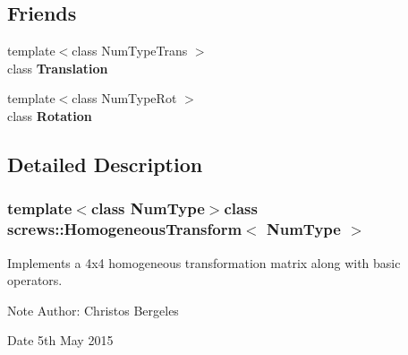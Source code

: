 \subsection*{Friends}
\begin{DoxyCompactItemize}
\item 
\hypertarget{classscrews_1_1_homogeneous_transform_a01e1886aafbf1483da899aba3b6c58da}{{\footnotesize template$<$class Num\+Type\+Trans $>$ }\\class {\bfseries Translation}}\label{classscrews_1_1_homogeneous_transform_a01e1886aafbf1483da899aba3b6c58da}

\item 
\hypertarget{classscrews_1_1_homogeneous_transform_a71cdfb2347f288c41e58374b57613143}{{\footnotesize template$<$class Num\+Type\+Rot $>$ }\\class {\bfseries Rotation}}\label{classscrews_1_1_homogeneous_transform_a71cdfb2347f288c41e58374b57613143}

\end{DoxyCompactItemize}


\subsection{Detailed Description}
\subsubsection*{template$<$class Num\+Type$>$class screws\+::\+Homogeneous\+Transform$<$ Num\+Type $>$}

Implements a 4x4 homogeneous transformation matrix along with basic operators. 

\begin{DoxyNote}{Note}
Author\+: Christos Bergeles 
\end{DoxyNote}
\begin{DoxyDate}{Date}
5th May 2015 
\end{DoxyDate}


